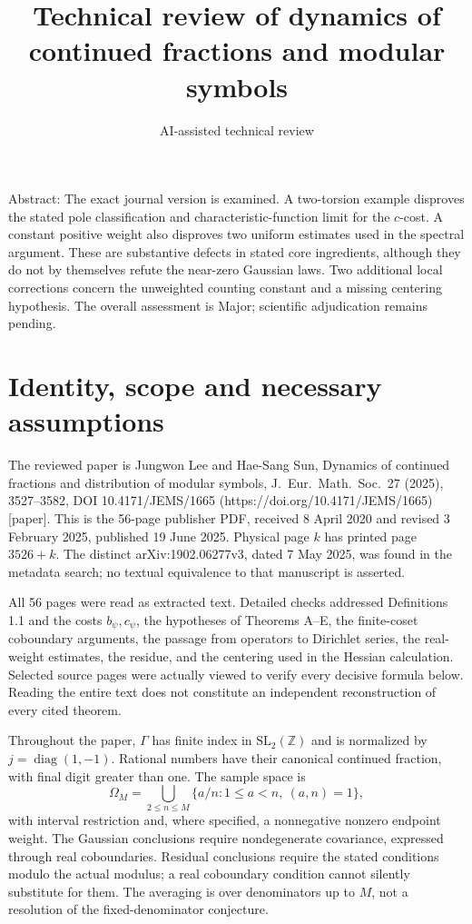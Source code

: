 \documentclass[10pt]{article}
\title{Technical review of dynamics of continued fractions and modular symbols}
\author{AI-assisted technical review}
\date{}
\begin{document}
\maketitle
Abstract: The exact journal version is examined. A two-torsion example disproves the stated pole classification and characteristic-function limit for the \(c\)-cost. A constant positive weight also disproves two uniform estimates used in the spectral argument. These are substantive defects in stated core ingredients, although they do not by themselves refute the near-zero Gaussian laws. Two additional local corrections concern the unweighted counting constant and a missing centering hypothesis. The overall assessment is Major; scientific adjudication remains pending.\par
\section*{Identity, scope and necessary assumptions}
The reviewed paper is Jungwon Lee and Hae-Sang Sun, Dynamics of continued fractions and distribution of modular symbols, J. Eur. Math. Soc. 27 (2025), 3527–3582, DOI 10.4171/JEMS/1665 (https://doi.org/10.4171/JEMS/1665) [paper]. This is the 56-page publisher PDF, received 8 April 2020 and revised 3 February 2025, published 19 June 2025. Physical page \(k\) has printed page \(3526+k\). The distinct arXiv:1902.06277v3, dated 7 May 2025, was found in the metadata search; no textual equivalence to that manuscript is asserted.\par
All 56 pages were read as extracted text. Detailed checks addressed Definitions 1.1 and the costs \(b_\psi,c_\psi\), the hypotheses of Theorems A–E, the finite-coset coboundary arguments, the passage from operators to Dirichlet series, the real-weight estimates, the residue, and the centering used in the Hessian calculation. Selected source pages were actually viewed to verify every decisive formula below. Reading the entire text does not constitute an independent reconstruction of every cited theorem.\par
Throughout the paper, \(\Gamma\) has finite index in \(\mathrm{SL}_2(\mathbb Z)\) and is normalized by \(j=\operatorname{diag}(1,-1)\). Rational numbers have their canonical continued fraction, with final digit greater than one. The sample space is \[\Omega_M=\bigcup_{2\le n\le M}
 \{a/n:1\le a<n,\ (a,n)=1\},\] with interval restriction and, where specified, a nonnegative nonzero endpoint weight. The Gaussian conclusions require nondegenerate covariance, expressed through real coboundaries. Residual conclusions require the stated conditions modulo the actual modulus; a real coboundary condition cannot silently substitute for them. The averaging is over denominators up to \(M\), not a resolution of the fixed-denominator conjecture.\par
\end{document}

